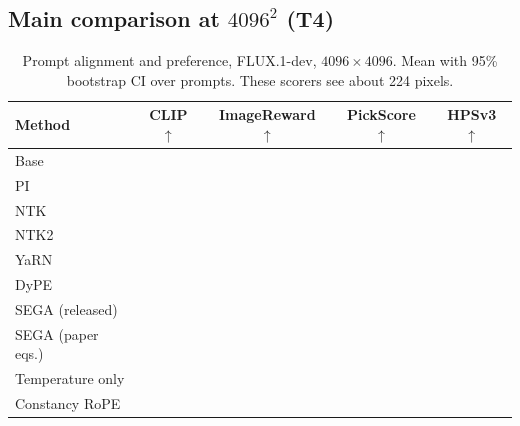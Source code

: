 \begin{figure}[t]
\centering
{}
\caption{}
\label{fig:t3}
\end{figure}

\subsection{Main comparison at \texorpdfstring{$4096^2$}{4096x4096} (T4)}
\label{sec:res-main}

\begin{table}[t]
\centering
\small
\caption{Prompt alignment and preference, FLUX.1-dev, $4096\times4096$. Mean with 95\% bootstrap CI over prompts. These scorers see about 224 pixels. }
\label{tab:main-semantic}
\begin{tabular}{@{}lcccc@{}}
\toprule
Method & CLIP $\uparrow$ & ImageReward $\uparrow$ & PickScore $\uparrow$ & HPSv3 $\uparrow$ \\
\midrule
Base & & & & \\
PI & & & & \\
NTK & & & & \\
NTK2 & & & & \\
YaRN & & & & \\
DyPE & & & & \\
SEGA (released) & & & & \\
SEGA (paper eqs.) & & & & \\
\midrule
Temperature only & & & & \\
Constancy RoPE & & & & \\
\bottomrule
\end{tabular}
\end{table}

